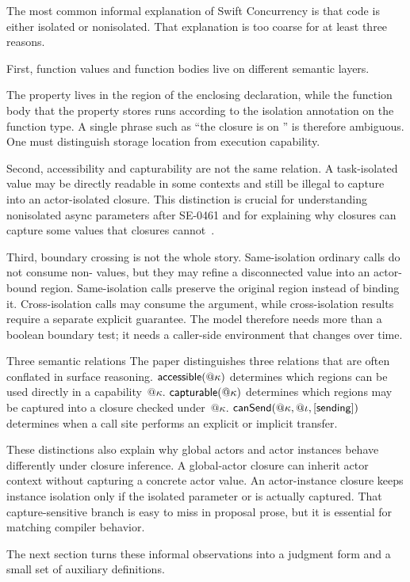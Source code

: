 The most common informal explanation of Swift Concurrency is that code is either isolated or nonisolated. That explanation is too coarse for at least three reasons.

First, function values and function bodies live on different semantic layers.


The property  lives in the region of the enclosing declaration, while the function body that the property stores runs according to the isolation annotation on the function type. A single phrase such as ``the closure is on '' is therefore ambiguous. One must distinguish storage location from execution capability.

Second, accessibility and capturability are not the same relation. A task-isolated value may be directly readable in some contexts and still be illegal to capture into an actor-isolated closure. This distinction is crucial for understanding nonisolated async parameters after SE-0461 and for explaining why  closures can capture some values that  closures cannot~\cite{se0461}.

Third, boundary crossing is not the whole story. Same-isolation ordinary calls do not consume non- values, but they may refine a disconnected value into an actor-bound region. Same-isolation  calls preserve the original region instead of binding it. Cross-isolation calls may consume the argument, while cross-isolation results require a separate explicit  guarantee. The model therefore needs more than a boolean boundary test; it needs a caller-side environment that changes over time.

\begin{definitionbox}{Three semantic relations}
The paper distinguishes three relations that are often conflated in surface reasoning. $\textsf{accessible}(@\kappa)$ determines which regions can be used directly in a capability~$@\kappa$. $\textsf{capturable}(@\kappa)$ determines which regions may be captured into a closure checked under~$@\kappa$. $\textsf{canSend}(@\kappa, @\iota, [\textsf{sending}])$ determines when a call site performs an explicit or implicit transfer.
\end{definitionbox}

These distinctions also explain why global actors and actor instances behave differently under closure inference. A global-actor closure can inherit actor context without capturing a concrete actor value. An actor-instance closure keeps instance isolation only if the isolated parameter or  is actually captured. That capture-sensitive branch is easy to miss in proposal prose, but it is essential for matching compiler behavior.

The next section turns these informal observations into a judgment form and a small set of auxiliary definitions.

